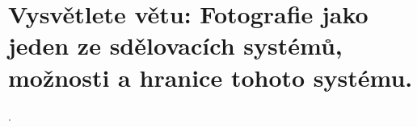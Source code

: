 \section{Vysvětlete větu: Fotografie jako jeden ze sdělovacích systémů, možnosti a hranice tohoto systému.}.